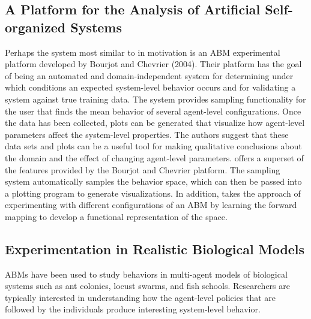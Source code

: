 \subsection{A Platform for the Analysis of Artificial Self-organized Systems}
Perhaps the system most similar to \fw in motivation is an ABM experimental platform developed by Bourjot and Chevrier (2004)\nocite{bourjot2004platform}.
Their platform has the goal of being an automated and domain-independent system for determining under which conditions an expected system-level behavior occurs and for validating a system against true training data.
The system provides sampling functionality for the user that finds the mean behavior of several agent-level configurations.
Once the data has been collected, plots can be generated that visualize how agent-level parameters affect the system-level properties.
The authors suggest that these data sets and plots can be a useful tool for making qualitative conclusions about the domain and the effect of changing agent-level parameters.
\fw offers a superset of the features provided by the Bourjot and Chevrier platform.
The \fw sampling system automatically samples the behavior space, which can then be passed into a plotting program to generate visualizations.
In addition, \fw takes the approach of experimenting with different configurations of an ABM by learning the forward mapping to develop a functional representation of the space.

\subsection{Experimentation in Realistic Biological Models}
ABMs have been used to study behaviors in multi-agent models of biological systems such as ant colonies, locust swarms, and fish schools.
Researchers are typically interested in understanding how the agent-level policies that are followed by the individuals produce interesting system-level behavior.

